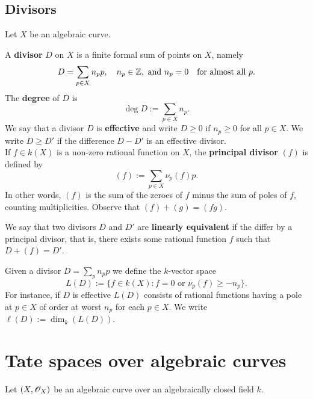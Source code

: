 \subsection{Divisors}
Let $X$ be an algebraic curve. 
\begin{definition}\label{def:divisors}
	A \textbf{divisor} $D$ on $X$ is a finite formal sum of points on $X$, namely
	\[
		D = \sum_{p\in X} n_{p}p, \quad n_{p}\in {\mathbb Z},\text{ and }n_{p} = 0 \quad\text{for almost all } p.
	\]
	The \textbf{degree} of $D$ is
	\[
		\deg D := \sum_{p\in X}n_{p}.
	\]
	We say that a divisor $D$ is \textbf{effective} and write $D\geq 0$ if $n_{p}\geq 0$ for all $p\in X$. We write $D\geq D'$ if the difference $D - D'$ is an effective divisor. \\
	If $f\in k(X)$ is a non-zero rational function on $X$, the \textbf{principal divisor} $(f)$ is defined by
	\[
		(f):=\sum_{p\in X}\nu_{p}(f)p.
	\]
	In other words, $(f)$ is the sum of the zeroes of $f$ minus the sum of poles of $f$, counting multiplicities. Observe that $(f) + (g) = (fg)$. 

	We say that two divisors $D$ and $D'$ are \textbf{linearly equivalent} if the differ by a principal divisor, that is, there exists some rational function $f$ such that $D + (f) = D'$.

	Given a divisor $D = \sum_{p}n_{p}p$ we define the $k$-vector space
	\[
		L(D) := \{f\in k(X)\colon f = 0\text{ or } \nu_{p}(f) \geq -n_{p}\}.
	\]
	For instance, if $D$ is effective $L(D)$ consists of rational functions having a pole at $p\in X$ of order at worst $n_{p}$ for each $p\in X$. We write $\ell(D) := \dim_{k}(L(D))$.
\end{definition}
	

\section{Tate spaces over algebraic curves}
Let $(X,{\mathscr O}_{X})$ be an algebraic curve over an algebraically closed field $k$.
